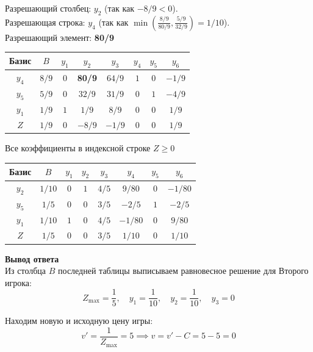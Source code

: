 \documentclass[a4paper,12pt]{article}
\begin{document}
\vspace{0.5cm}
Разрешающий столбец: $y_2$ (так как $-8/9 < 0$).\\
Разрешающая строка: $y_4$ (так как $\min(\frac{8/9}{80/9}, \frac{5/9}{32/9}) = 1/10$).\\
Разрешающий элемент: \textbf{80/9}

\begin{center}
\renewcommand{\arraystretch}{1.8}
\begin{tabular}{|c|c|c|c|c|c|c|c|}
\hline
Базис & $B$ & $y_1$ & $y_2$ & $y_3$ & $y_4$ & $y_5$ & $y_6$ \\ \hline
$y_4$ & $8/9$ & $0$ & \textbf{80/9} & $64/9$ & $1$ & $0$ & $-1/9$ \\ \hline
$y_5$ & $5/9$ & $0$ & $32/9$ & $31/9$ & $0$ & $1$ & $-4/9$ \\ \hline
$y_1$ & $1/9$ & $1$ & $1/9$  & $8/9$  & $0$ & $0$ & $1/9$  \\ \hline
$Z$   & $1/9$ & $0$ & $-8/9$ & $-1/9$ & $0$ & $0$ & $1/9$  \\ \hline
\end{tabular}
\end{center}

\vspace{0.5cm}
Все коэффициенты в индексной строке $Z \ge 0$

\begin{center}
\renewcommand{\arraystretch}{1.8}
\begin{tabular}{|c|c|c|c|c|c|c|c|}
\hline
Базис & $B$ & $y_1$ & $y_2$ & $y_3$ & $y_4$ & $y_5$ & $y_6$ \\ \hline
$y_2$ & $1/10$ & $0$ & $1$ & $4/5$ & $9/80$ & $0$ & $-1/80$\\ \hline
$y_5$ & $1/5$  & $0$ & $0$ & $3/5$ & $-2/5$ & $1$ & $-2/5$ \\ \hline
$y_1$ & $1/10$ & $1$ & $0$ & $4/5$ & $-1/80$& $0$ & $9/80$ \\ \hline
$Z$   & $1/5$  & $0$ & $0$ & $3/5$ & $1/10$ & $0$ & $1/10$ \\ \hline
\end{tabular}
\end{center}

\vspace{0.5cm}
\textbf{Вывод ответа}\\
Из столбца $B$ последней таблицы выписываем равновесное решение для Второго игрока:
$$Z_{\max} = \frac{1}{5}, \quad y_1 = \frac{1}{10}, \quad y_2 = \frac{1}{10}, \quad y_3 = 0$$

Находим новую и исходную цену игры:
$$v' = \frac{1}{Z_{\max}} = 5 \implies v = v' - C = 5 - 5 = 0$$
\end{document}
